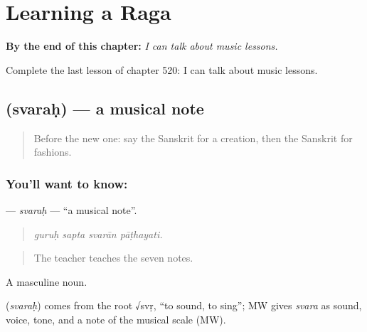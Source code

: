 
\chapter{Learning a Raga}
\label{ch:sa-learning-a-raga}

\begin{chapteropening}
\textbf{By the end of this chapter:} \emph{I can talk about music lessons.}

Complete the last lesson of chapter 520: I can talk about music lessons.
\end{chapteropening}

\section[\texorpdfstring{\sk{स्वरः} (svaraḥ)}{स्वरः (svaraḥ)}]{ (svaraḥ) — a musical note}

\label{lesson:SA-C520-svarah}



\begin{quote}
Before the new one: say the Sanskrit for a creation, then the Sanskrit for fashions.
\end{quote}

\subsection*{You'll want to know: }
\textbf{} — \emph{svaraḥ} — \textquotedblleft{}a musical note\textquotedblright{}.

\begin{quote}
   
\end{quote}

\begin{quote}
\emph{guruḥ sapta svarān pāṭhayati.}
\end{quote}

\begin{quote}
The teacher teaches the seven notes.
\end{quote}

A masculine noun.

\begin{cousinweb}
\textbf{} (\emph{svaraḥ}) comes from the root √svṛ, \textquotedblleft{}to sound, to sing\textquotedblright{}; MW gives \emph{svara} as sound, voice, tone, and a note of the musical scale (MW).
\end{cousinweb}

